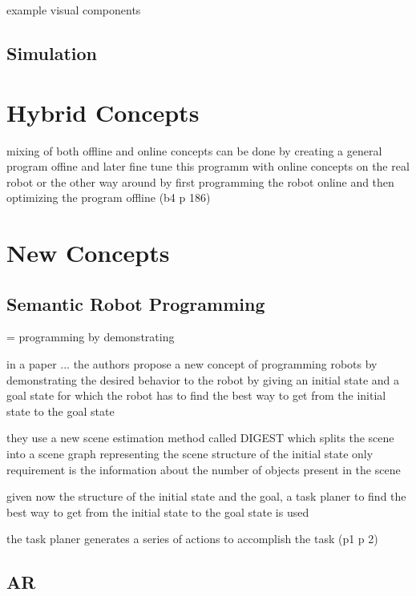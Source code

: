 \documentclass[conference]{IEEEtran}
\begin{document}
        example visual components

        

    \subsection{Simulation}

\section{Hybrid Concepts}

    mixing of both offline and online concepts
    can be done by creating a general program offine and later  fine tune this programm with online concepts on the real robot
    or the other way around by first programming the robot online and then optimizing the program offline
    (b4 p 186)

\section{New Concepts} %

    \subsection{Semantic Robot Programming}

        = programming by demonstrating

        in a paper ... the authors propose a new concept of programming robots by demonstrating the desired behavior to the robot by giving an initial state and a goal state for which the robot has to find the best way to get from the initial state to the goal state

        they use a new scene estimation method called DIGEST which splits the scene into a scene graph representing the scene structure of the initial state
        only requirement is the information about the number of objects present in the scene

        given now the structure of the initial state and the goal, a task planer to find the best way to get from the initial state to the goal state is used

        the task planer generates a series of actions to accomplish the task
        (p1 p 2)

    \subsection{AR}
    
\end{document}
